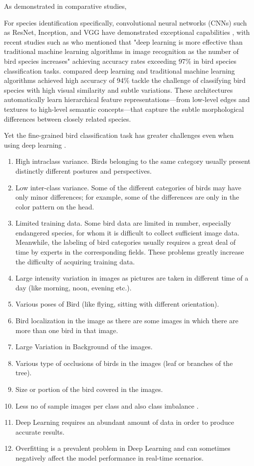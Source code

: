 \documentclass[a4paper,12pt]{report}
\begin{document}
As demonstrated in comparative studies, 

For species identification specifically, convolutional neural networks (CNNs) such as ResNet, Inception, and VGG have demonstrated exceptional capabilities \cite{essay101313}, with recent studies such as \citep{transferln97} who mentioned that "deep learning is more effective than traditional machine learning algorithms in image recognition as the number of bird species increases" achieving accuracy rates exceeding 97\% in bird species classification tasks. \citep{ALFATEMI2024558} compared deep learning and traditional machine learning algorithms achieved high accuracy of 94\% tackle the challenge of classifying bird species with high visual similarity and subtle variations. These architectures automatically learn hierarchical feature representations—from low-level edges and textures to high-level semantic concepts—that capture the subtle morphological differences between closely related species.

Yet the fine-grained bird classification task has greater challenges even when using deep learning  \cite{source3} \citep{ani13020264}.
\begin{enumerate}
    \item High intraclass variance. Birds belonging to the same category usually present distinctly different postures and perspectives.
    \item Low inter-class variance. Some of the different categories of birds may have only minor differences; for example, some of the differences are only in the color pattern on the head.
    \item Limited training data. Some bird data are limited in number, especially endangered species, for whom it is difficult to collect sufficient image data. Meanwhile, the labeling of bird categories usually requires a great deal of time by experts in the corresponding fields. These problems greatly increase the difficulty of acquiring training data.
    \item Large intensity variation in images as pictures are taken in different time of a day (like morning, noon, evening etc.).
    \item Various poses of Bird (like flying, sitting with different orientation).
    \item Bird localization in the image as there are some images in which there are more than one bird in that image.
    \item Large Variation in Background of the images.
    \item Various type of occlusions of birds in the images (leaf or branches of the tree).
    \item Size or portion of the bird covered in the images.
    \item Less no of sample images per class and also class imbalance \citep{10.1007/978-981-15-1387-9_3}.
    \item Deep Learning requires an abundant amount of data in order to produce accurate results.
    \item Overfitting is a prevalent problem in Deep Learning and can sometimes negatively affect the model performance in real-time scenarios.
\end{enumerate}
\end{document}
